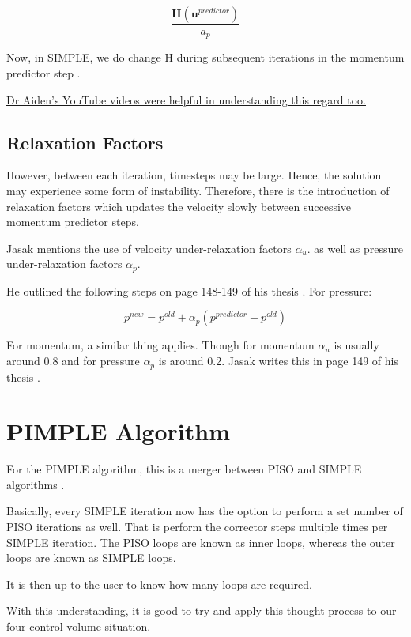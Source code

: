 \documentclass[masters]{ucbthesis}
\renewcommand{\_}{\kern-1.5pt\textunderscore\kern-1.5pt}
\begin{document}
\begin{equation*}
	\frac{\textbf{H}(\textbf{u}^{predictor})}{a_p}
\end{equation*}

Now, in SIMPLE, we do change H during subsequent iterations in the 
momentum predictor step \citep{jasak1996error}.

\href{https://www.youtube.com/watch?v=ahdW5TKacok}{
	Dr Aiden's YouTube videos were helpful in understanding this regard 
	too.
}

\subsection{Relaxation Factors}

However, between each iteration, timesteps may be large. Hence, the 
solution may experience some form of instability.
Therefore, there is the introduction of relaxation factors which updates 
the velocity slowly between successive momentum predictor steps.

Jasak mentions the use of velocity under-relaxation factors $\alpha_u$.
as well as pressure under-relaxation factors $\alpha_p$.

He outlined the following steps on page 148-149 of his thesis 
\citep{jasak1996error}. For pressure:

$$p^{new} = p^{old} + \alpha_p (p^{predictor} - p^{old})$$

For momentum, a similar thing applies. Though for momentum $\alpha_u$
is usually around 0.8 and for pressure $\alpha_p$ is around 0.2. Jasak 
writes this in page 149 of his thesis \citep{jasak1996error}.

\section{PIMPLE Algorithm}

For the PIMPLE algorithm, this is a merger between PISO and SIMPLE 
algorithms \citep{greenshields2022notes}.

Basically, every SIMPLE iteration now has the option to perform a set 
number of PISO iterations as well. That is perform the corrector steps 
multiple times per SIMPLE iteration. The PISO loops are known as inner loops,
whereas the outer loops are known as SIMPLE loops.

It is then up to the user to know how many loops are required.

With this understanding, it is good to try and apply this thought process 
to our four control volume situation.
\end{document}
